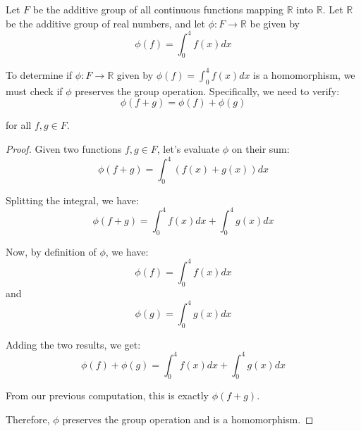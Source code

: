 \documentclass[12pt]{amsart}
\theoremstyle{definition}
\numberwithin{equation}{section}
\theoremstyle{plain}
\newcommand{\R}{\mathbb{R}}
\begin{document}
\begin{exercise}{10} Let $F$ be the additive group of all continuous functions mapping $\R$ into $\R$. Let $\R$ be the additive group of real
    numbers, and let $\phi : F \rightarrow \R$ be given by
    \[\phi(f) = \int_{0}^{4}f(x)dx\]


    To determine if \( \phi : F \rightarrow \mathbb{R} \) given by \( \phi(f) = \int_{0}^{4}f(x)dx \) is a homomorphism, we must check if \( \phi \) preserves the group operation. Specifically, we need to verify:
    \[
        \phi(f + g) = \phi(f) + \phi(g)
        \]
        
        for all \( f, g \in F \).
        
        \begin{proof}
Given two functions \( f, g \in F \), let's evaluate \( \phi \) on their sum:
\[
\phi(f + g) = \int_{0}^{4}(f(x) + g(x))dx
\]

Splitting the integral, we have:
\[
\phi(f + g) = \int_{0}^{4}f(x)dx + \int_{0}^{4}g(x)dx
\]

Now, by definition of \( \phi \), we have:
\[
\phi(f) = \int_{0}^{4}f(x)dx
\]
and
\[
\phi(g) = \int_{0}^{4}g(x)dx
\]

Adding the two results, we get:
\[
\phi(f) + \phi(g) = \int_{0}^{4}f(x)dx + \int_{0}^{4}g(x)dx
\]

From our previous computation, this is exactly \( \phi(f + g) \).

Therefore, \( \phi \) preserves the group operation and is a homomorphism.

    \end{proof}
\end{exercise}
\vspace*{20pt}
\end{document}
